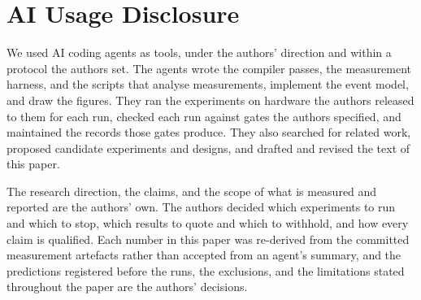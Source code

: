 \section*{AI Usage Disclosure}

We used AI coding agents as tools, under the authors' direction and within a protocol the authors set.
The agents wrote the compiler passes, the measurement harness, and the scripts that analyse measurements, implement the event model, and draw the figures.
They ran the experiments on hardware the authors released to them for each run, checked each run against gates the authors specified, and maintained the records those gates produce.
They also searched for related work, proposed candidate experiments and designs, and drafted and revised the text of this paper.

The research direction, the claims, and the scope of what is measured and reported are the authors' own.
The authors decided which experiments to run and which to stop, which results to quote and which to withhold, and how every claim is qualified.
Each number in this paper was re-derived from the committed measurement artefacts rather than accepted from an agent's summary, and the predictions registered before the runs, the exclusions, and the limitations stated throughout the paper are the authors' decisions.
